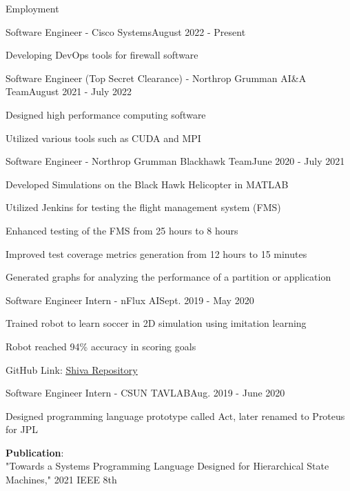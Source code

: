 \documentclass{resume}
\begin{document}
\begin{rSection}{Employment}
    \begin{rSubsection}{Software Engineer - Cisco Systems}{August 2022 - Present}
        \item Developing DevOps tools for firewall software
    \end{rSubsection}
    \begin{rSubsection}{Software Engineer (Top Secret Clearance) - Northrop Grumman AI\&A Team}{August 2021 - July 2022}
        \item Designed high performance computing software
        \item Utilized various tools such as CUDA and MPI
    \end{rSubsection}
    \begin{rSubsection}{Software Engineer - Northrop Grumman Blackhawk Team}{June 2020 - July 2021}
        \item Developed Simulations on the Black Hawk Helicopter in MATLAB
        \item Utilized Jenkins for testing the flight management system (FMS)
        \item Enhanced testing of the FMS from 25 hours to 8 hours
        \item Improved test coverage metrics generation from 12 hours to 15 minutes
        \item Generated graphs for analyzing the performance of a partition or application
    \end{rSubsection}
    \begin{rSubsection}{Software Engineer Intern - nFlux AI}{Sept. 2019 - May 2020}
        \item Trained robot to learn soccer in 2D simulation using imitation learning
        \item Robot reached 94\% accuracy in scoring goals
        \item GitHub Link: \href{https://github.com/nflux/Shiva}{\color{blue}\underline{Shiva Repository}}
    \end{rSubsection}
    \begin{rSubsection}{Software Engineer Intern - CSUN TAVLAB}{Aug. 2019 - June 2020}
        \item Designed programming language prototype called Act, later renamed to Proteus for JPL
        \item \textbf{Publication}: \\
          "Towards a Systems Programming Language Designed for Hierarchical State Machines," 2021 IEEE 8th \\

\end{rSubsection}
\end{rSection}
\end{document}

